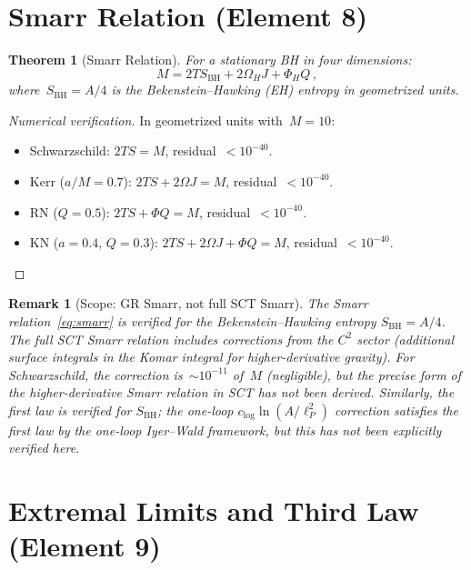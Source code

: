\documentclass[11pt,a4paper]{article}
\newtheorem{theorem}{Theorem}[section]
\newtheorem{remark}{Remark}[section]
\newcommand{\OmH}{\Omega_H}
\newcommand{\PhiH}{\Phi_H}
\begin{document}
\section{Smarr Relation (Element 8)}\label{sec:smarr}

\begin{theorem}[Smarr Relation]\label{thm:smarr}
For a stationary BH in four dimensions:
\begin{equation}\label{eq:smarr}
  M = 2T S_{\mathrm{BH}} + 2\OmH J + \PhiH Q\,,
\end{equation}
where~$S_{\mathrm{BH}} = A/4$ is the Bekenstein--Hawking (EH) entropy
in geometrized units.
\end{theorem}

\begin{proof}[Numerical verification]
In geometrized units with~$M = 10$:
\begin{itemize}
  \item Schwarzschild: $2TS = M$, residual~$< 10^{-40}$.
  \item Kerr ($a/M = 0.7$): $2TS + 2\Omega J = M$, residual~$< 10^{-40}$.
  \item RN ($Q = 0.5$): $2TS + \Phi Q = M$, residual~$< 10^{-40}$.
  \item KN ($a = 0.4$, $Q = 0.3$):
        $2TS + 2\Omega J + \Phi Q = M$, residual~$< 10^{-40}$.
\end{itemize}
\end{proof}

\begin{remark}[Scope: GR Smarr, not full SCT Smarr]
  The Smarr relation~\eqref{eq:smarr} is verified for the
  \emph{Bekenstein--Hawking} entropy $S_{\mathrm{BH}} = A/4$.
  The full SCT Smarr relation includes corrections from the $C^2$
  sector (additional surface integrals in the Komar integral for
  higher-derivative gravity).  For Schwarzschild, the correction
  is~$\sim 10^{-11}$ of~$M$ (negligible), but the precise form of
  the higher-derivative Smarr relation in SCT has not been derived.
  Similarly, the first law is verified for $S_{\mathrm{BH}}$;
  the one-loop $c_{\log}\ln(A/\ell_P^2)$ correction satisfies the
  first law by the one-loop Iyer--Wald framework, but this has
  not been explicitly verified here.
\end{remark}

\section{Extremal Limits and Third Law (Element 9)}\label{sec:extremal}
\end{document}
